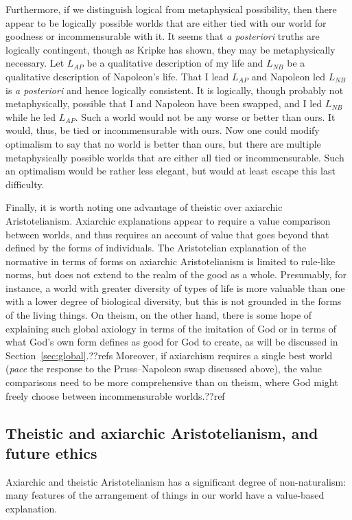 Furthermore, if we distinguish logical from metaphysical possibility, then there appear to be logically
possible worlds that are either tied with our world for goodness or incommensurable with it. It seems
that \textit{a posteriori} truths are logically contingent, though as Kripke has shown, they may be
metaphysically necessary. Let $L_{AP}$ be a qualitative description of my life and $L_{NB}$ be a qualitative
description of Napoleon's life. That I lead $L_{AP}$ and Napoleon led $L_{NB}$ is \textit{a posteriori} and
hence logically consistent. It is logically, though probably not metaphysically, possible that I and Napoleon
have been swapped, and I led $L_{NB}$ while he led $L_{AP}$. Such a world would not be any worse or better than
ours. It would, thus, be tied or incommensurable with ours. Now one could modify optimalism to say that
no world is better than ours, but there are multiple metaphysically possible worlds that are either all tied
or incommensurable. Such an optimalism would be rather less elegant, but would at least escape this last difficulty.	

Finally, it is worth noting one advantage of theistic over axiarchic Aristotelianism. Axiarchic explanations 
appear to require a value comparison between worlds, and thus requires an account of value that goes beyond 
that defined by the forms of individuals. The Aristotelian explanation of the normative in terms of forms on
axiarchic Aristotelianism is limited to rule-like norms, but does not extend to the realm of the good as a whole.
Presumably, for instance, a world with greater diversity of types of life is more valuable than one with a lower
degree of biological diversity, but this is not grounded in the forms of the living things. On theism, on the other 
hand, there is some hope of explaining such global axiology in terms of the imitation of God or in terms of what
God's own form defines as good for God to create, as will be discussed in Section~\ref{sec:global}.??refs Moreover, if
axiarchism requires a single best world (\textit{pace} the response to the Pruss--Napoleon swap discussed
above), the value comparisons need to be more comprehensive than on theism,
where God might freely choose between incommensurable worlds.??ref

\subsection{Theistic and axiarchic Aristotelianism, and future ethics}
Axiarchic and theistic Aristotelianism has a significant degree of non-naturalism: many features of the arrangement
of things in our world have a value-based explanation. 

